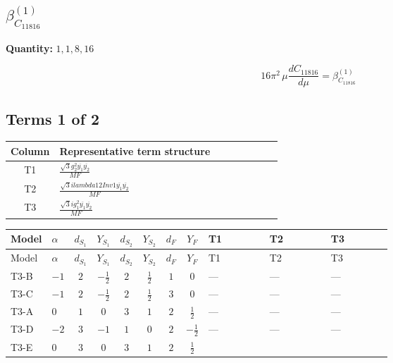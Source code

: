\documentclass[8pt]{article}
\begin{document}
\begin{landscape}
\section*{$\beta_{C_{11816}}^{(1)}$}
\noindent\textbf{Quantity: }$\mathrm{1,1,8,16}$\par\smallskip
\[16\pi^2\,\mu\frac{d C_{11816}}{d\mu}=\beta_{C_{11816}}^{(1)}\]
\subsection*{Terms 1 of 2}
\begin{center}
\begin{tabular}{@{}c >{\raggedright\arraybackslash}p{0.82\linewidth}@{}}
\toprule
Column & Representative term structure \\
\midrule
T1 & \(\displaystyle \frac{\sqrt{3} g_{2}^{2} \overline{y_{1}} \overline{y_{2}}}{MF}\) \\
\midrule
T2 & \(\displaystyle \frac{\sqrt{3} i lambda12Inv1 \overline{y_{1}} \overline{y_{2}}}{MF}\) \\
\midrule
T3 & \(\displaystyle \frac{\sqrt{3} i g_{1}^{2} \overline{y_{1}} \overline{y_{2}}}{MF}\) \\
\midrule
\bottomrule
\end{tabular}
\end{center}
\smallskip
\tiny
\begin{longtable}{@{}llcccccc >{\raggedright\arraybackslash}p{0.21\linewidth} >{\raggedright\arraybackslash}p{0.21\linewidth} >{\raggedright\arraybackslash}p{0.21\linewidth}@{}}
\toprule
Model & $\alpha$ & $d_{S_1}$ & $Y_{S_1}$ & $d_{S_2}$ & $Y_{S_2}$ & $d_F$ & $Y_F$ & T1 & T2 & T3 \\
\midrule
\endfirsthead
\toprule
Model & $\alpha$ & $d_{S_1}$ & $Y_{S_1}$ & $d_{S_2}$ & $Y_{S_2}$ & $d_F$ & $Y_F$ & T1 & T2 & T3 \\
\midrule
\endhead
T3-B & $-1$ & $2$ & $-\frac{1}{2}$ & $2$ & $\frac{1}{2}$ & $1$ & $0$ & --- & --- & --- \\
\midrule
T3-C & $-1$ & $2$ & $-\frac{1}{2}$ & $2$ & $\frac{1}{2}$ & $3$ & $0$ & --- & --- & --- \\
\midrule
T3-A & $0$ & $1$ & $0$ & $3$ & $1$ & $2$ & $\frac{1}{2}$ & --- & --- & --- \\
\midrule
T3-D & $-2$ & $3$ & $-1$ & $1$ & $0$ & $2$ & $-\frac{1}{2}$ & --- & --- & --- \\
\midrule
T3-E & $0$ & $3$ & $0$ & $3$ & $1$ & $2$ & $\frac{1}{2}$ & \scriptsize\adjustbox{max width=\linewidth}{$\begin{gathered} \frac{\sqrt{3} g_{2}^{2} \overline{y_{1}} \overline{y_{2}}}{6 MF}\end{gathered}$} & \scriptsize\adjustbox{max width=\linewidth}{$\begin{gathered} - \frac{\sqrt{3} i lambda12Inv1 \overline{y_{1}} \overline{y_{2}}}{6 MF}\end{gathered}$} & \scriptsize\adjustbox{max width=\linewidth}{$\begin{gathered} \frac{\sqrt{3} i g_{1}^{2} \overline{y_{1}} \overline{y_{2}}}{8 MF}\end{gathered}$} \\

\end{longtable}
\end{landscape}
\end{document}
